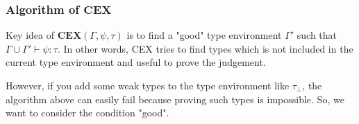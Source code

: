 \documentclass[runningheads]{llncs}
\newcommand \true {\textbf{tt}}
\newcommand \stypeint {\textbf{Int}}
\newcommand \stypebool {\bullet}
\newcommand \constraint {\theta}
\newcommand \typeint[1]{{#1} : \stypeint}
\newcommand \typebool[1]{\stypebool \langle #1 \rangle}
\begin{document}
\subsubsection{Algorithm of \( \mathbf{CEX} \)}

Key idea of \(\textbf{CEX}(\Gamma, \psi, \tau) \) is to find a "good" type
environment \(\Gamma' \) such that \(\Gamma \cup \Gamma' \vdash \psi: \tau \).
In other words, CEX tries to find types which is not included in the current
type environment and useful to prove the judgement.

However, if you add some weak types to the type environment like \(\tau_\bot\),
the algorithm above can easily fail because proving such types is impossible.
So, we want to consider the condition "good".



%
%
%
%
\end{document}
